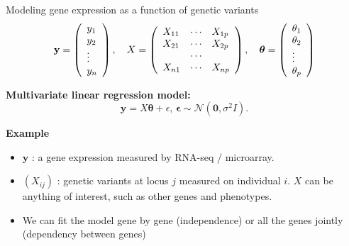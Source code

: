 \documentclass[
  ignorenonframetext,
  aspectratio=169]{beamer}
\begin{document}
\begin{frame}{Modeling gene expression as a function of genetic
variants}
\protect\hypertarget{modeling-gene-expression-as-a-function-of-genetic-variants}{}
\[
\mathbf{y} = \left(\begin{array}{l}
y_{1}\\
y_{2}\\
\vdots\\
y_{n}
\end{array}\right),\quad
X = \left(\begin{array}{l l l}
X_{11} & \cdots & X_{1p} \\
X_{21} & \cdots & X_{2p} \\
 & \cdots & \\
X_{n1} & \cdots & X_{np} \\
\end{array}\right),\quad
\boldsymbol{\theta} = \left(\begin{array}{l}
\theta_{1}\\
\theta_{2}\\
\vdots\\
\theta_{p}
\end{array}\right)
\]

\vfill

\textbf{Multivariate linear regression model:} \[
\mathbf{y} = X \boldsymbol{\theta} + \epsilon,\, \boldsymbol{\epsilon} \sim \mathcal{N}\!\left(\mathbf{0}, \sigma^{2}I\right).
\]

\vfill

\textbf{Example}

\begin{itemize}
\item
  \(\mathbf{y}\) : a gene expression measured by RNA-seq / microarray.
\item
  \({(X_{ij})}\) : genetic variants at locus \(j\) measured on
  individual \(i\). \(X\) can be anything of interest, such as other
  genes and phenotypes.
\item
  We can fit the model gene by gene (independence) or all the genes
  jointly (dependency between genes)
\end{itemize}
\end{frame}
\end{document}
